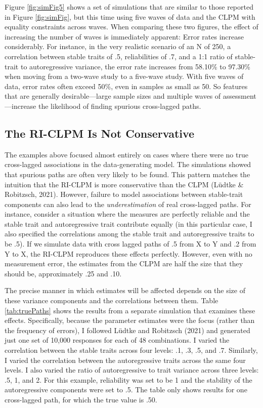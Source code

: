 \documentclass[
  english,
  man,floatsintext]{apa6}
\begin{document}
Figure \ref{fig:simFig5} shows a set of simulations that are similar to those reported in Figure \ref{fig:simFig}, but this time using five waves of data and the CLPM with equality constraints across waves. When comparing these two figures, the effect of increasing the number of waves is immediately apparent: Error rates increase considerably. For instance, in the very realistic scenario of an N of 250, a correlation between stable traits of .5, reliabilities of .7, and a 1:1 ratio of stable-trait to autoregressive variance, the error rate increases from 58.10\% to 97.30\% when moving from a two-wave study to a five-wave study. With five waves of data, error rates often exceed 50\%, even in samples as small as 50. So features that are generally desirable---large sample sizes and multiple waves of assessment---increase the likelihood of finding spurious cross-lagged paths.

\hypertarget{the-ri-clpm-is-not-conservative}{%
\subsection{The RI-CLPM Is Not Conservative}\label{the-ri-clpm-is-not-conservative}}

The examples above focused almost entirely on cases where there were no true cross-lagged associations in the data-generating model. The simulations showed that spurious paths are often very likely to be found. This pattern matches the intuition that the RI-CLPM is more conservative than the CLPM (Lüdtke \& Robitzsch, 2021). However, failure to model associations between stable-trait components can also lead to the \emph{underestimation} of real cross-lagged paths. For instance, consider a situation where the measures are perfectly reliable and the stable trait and autoregressive trait contribute equally (in this particular case, I also specified the correlations among the stable trait and autoregressive traits to be .5). If we simulate data with cross lagged paths of .5 from X to Y and .2 from Y to X, the RI-CLPM reproduces these effects perfectly. However, even with no measurement error, the estimates from the CLPM are half the size that they should be, approximately .25 and .10.

The precise manner in which estimates will be affected depends on the size of these variance components and the correlations between them. Table \ref{tab:truePaths} shows the results from a separate simulation that examines these effects. Specifically, because the parameter estimates were the focus (rather than the frequency of errors), I followed Lüdtke and Robitzsch (2021) and generated just one set of 10,000 responses for each of 48 combinations. I varied the correlation between the stable traits across four levels: .1, .3, .5, and .7. Similarly, I varied the correlation between the autoregressive traits across the same four levels. I also varied the ratio of autoregressive to trait variance across three levels: .5, 1, and 2. For this example, reliability was set to be 1 and the stability of the autoregressive components were set to .5. The table only shows results for one cross-lagged path, for which the true value is .50.
\end{document}
